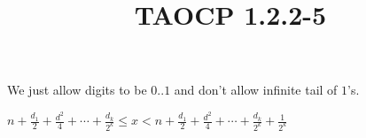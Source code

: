 \documentclass{article}
\title{TAOCP 1.2.2\mbox{-}5}
\begin{document}
\maketitle

We just allow digits to be \( 0..1 \) and don't allow infinite tail of \( 1 \)'s.

\( n + \frac{d_{1}}{2} + \frac{d^{2}}{4} + \cdots + \frac{d_{k}}{2^{k}} \leq x < n + \frac{d_{1}}{2} + \frac{d^{2}}{4} + \cdots + \frac{d_{k}}{2^{k}} + \frac{1}{2^{k}} \)
\end{document}
